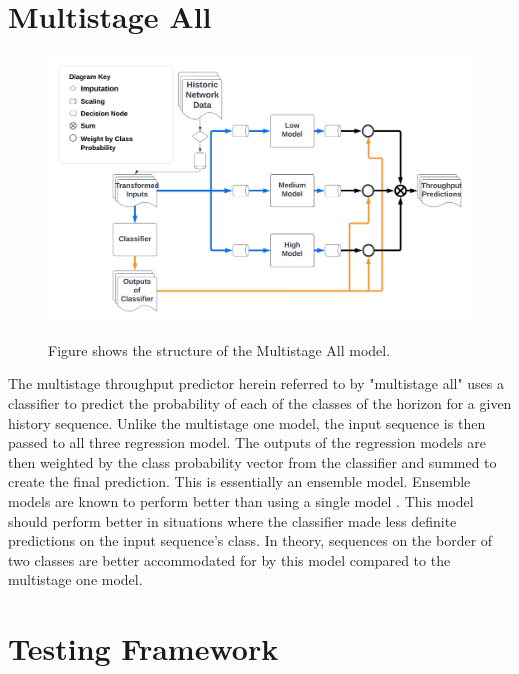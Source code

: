 \section{Multistage All}
\begin{figure}[h]
\centering
\includegraphics[scale=0.15]{Multistage All.png}
\label{fig:multistage_one}
\caption{Figure shows the structure of the Multistage All model.}
\end{figure}

The multistage throughput predictor herein referred to by "multistage all" uses a classifier to predict the probability of each of the classes of the horizon for a given history sequence. Unlike the multistage one model, the input sequence is then passed to all three regression model. The outputs of the regression models are then weighted by the class probability vector from the classifier and summed to create the final prediction. This is essentially an ensemble model. Ensemble models are known to perform better than using a single model \cite{https://doi.org/10.1002/widm.1249}. This model should perform better in situations where the classifier made less definite predictions on the input sequence's class. In theory, sequences on the border of two classes are better accommodated for by this model compared to the multistage one model.

\section{Testing Framework}